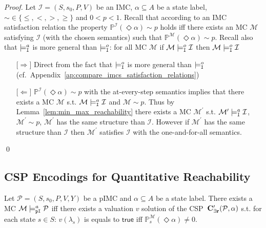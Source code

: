 \documentclass{llncs}
\newcommand{\mc}{\textnormal{MC}}
\newcommand{\imc}{\textnormal{IMC}}
\newcommand{\pimc}{\textnormal{pIMC}}
\newcommand{\csp}{\textnormal{CSP}}
\newcommand{\satisfactionImcOnce}{\ensuremath{\models^{o}_{\tt{I}}}}
\newcommand{\satisfactionImc}{\ensuremath{\models^{a}_{\tt{I}}}}
\newcommand{\satisfactionPimc}{\ensuremath{\models^a_{\tt{pI}}}}
\newcommand{\MerPrime}{\ensuremath{{\bf C^{\prime}_{{\exists}r}}}}
\newcommand{\cf} {cf.\ }
\newcommand{\Proba}            {\ensuremath{\mathbb{P}}}
\newcommand{\true}             {\ensuremath{\mathsf{true}}}
\newcommand{\ltlExists}{\ensuremath{\Diamond}}
\begin{document}
\begin{proof}
	Let $\mathcal{I} = (S,s_0,P,V)$ be an {\imc}, 
    $\alpha \subseteq A$ be a state label, 
    ${\sim} \in \{\le,<,>,\ge\}$ and $0 < p < 1$.
    Recall that according to an {\imc} satisfaction relation
    the property $\mathbb{P}^{\mathcal{I}}(\ltlExists \alpha) {\sim} p$ holds
    iff there exists an {\mc} $\mathcal{M}$ satisfying $\mathcal{I}$ 
    (with the chosen semantics) such that
	$\mathbb{P}^{\mathcal{M}}(\ltlExists \alpha) {\sim} p$.
    Recall also that $\satisfactionImc$ is more general than $\satisfactionImcOnce$: 
    for all {\mc} $\mathcal{M}$ if $\mathcal{M} \satisfactionImcOnce \mathcal{I}$ then 
    $\mathcal{M} \satisfactionImcOnce \mathcal{I}$
    \begin{itemize}
    	\item[$\lbrack\Rightarrow\rbrack$] Direct from the fact that 
        $\satisfactionImcOnce$ is more general than $\satisfactionImcOnce$ 
        (\cf Appendix~\ref{ap:compare_imcs_satisfaction_relations})
        
        \item[$\lbrack\Leftarrow\rbrack$] 
        $\mathbb{P}^{\mathcal{I}}(\ltlExists \alpha) {\sim} p$ with
        the at-every-step semantics implies that there exists
        a {\mc} $\mathcal{M}$ s.t.
        $\mathcal{M} \satisfactionImc \mathcal{I}$ and $\mathcal{M} {\sim} p$.
        Thus by Lemma~\ref{lem:min_max_reachability} there exists a {\mc} $\mathcal{M}^\prime$ s.t.
        $\mathcal{M}^\prime \satisfactionImc \mathcal{I}$, $\mathcal{M}^\prime {\sim} p$,
        $\mathcal{M}^\prime$ has the same structure than $\mathcal{I}$.
        However if $\mathcal{M}^\prime$ has the same structure than $\mathcal{I}$
        then $\mathcal{M}^\prime$ satisfies $\mathcal{I}$ with the one-and-for-all semantics.
	\end{itemize}\qed
\end{proof}

\subsection{{\csp} Encodings for Quantitative Reachability}
 \begin{proposition}\label{prop:model_reach_label}
 	Let  $\mathcal{P} = (S, s_0 , P, V, Y)$ be a {\pimc} and
 	$\alpha \subseteq A$ be a state label.
 	There exists a {\mc} $\mathcal{M} \satisfactionPimc \mathcal{P}$ iff
 	there exists a valuation $v$ solution of the \csp\ $\MerPrime(\mathcal{P},\alpha)$
 	s.t. for each state $s \in S$: 
 	$v(\lambda_s)$ is equals to {\true} iff $\Proba^\mathcal{M}_s(\ltlExists \alpha) \neq 0$.
 \end{proposition}
\end{document}
